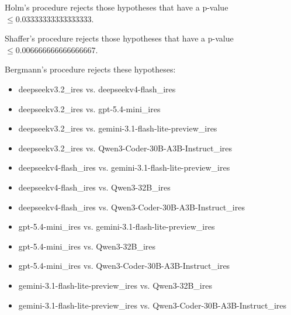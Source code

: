 \documentclass[a4paper,10pt]{article}
\begin{document}
\begin{landscape}
Holm's procedure rejects those hypotheses that have a p-value $\le0.03333333333333333$.


Shaffer's procedure rejects those hypotheses that have a p-value $\le0.006666666666666667$.


Bergmann's procedure rejects these hypotheses:


\begin{itemize}


\item deepseekv3.2_ires vs. deepseekv4-flash_ires
\item deepseekv3.2_ires vs. gpt-5.4-mini_ires
\item deepseekv3.2_ires vs. gemini-3.1-flash-lite-preview_ires
\item deepseekv3.2_ires vs. Qwen3-Coder-30B-A3B-Instruct_ires
\item deepseekv4-flash_ires vs. gemini-3.1-flash-lite-preview_ires
\item deepseekv4-flash_ires vs. Qwen3-32B_ires
\item deepseekv4-flash_ires vs. Qwen3-Coder-30B-A3B-Instruct_ires
\item gpt-5.4-mini_ires vs. gemini-3.1-flash-lite-preview_ires
\item gpt-5.4-mini_ires vs. Qwen3-32B_ires
\item gpt-5.4-mini_ires vs. Qwen3-Coder-30B-A3B-Instruct_ires
\item gemini-3.1-flash-lite-preview_ires vs. Qwen3-32B_ires
\item gemini-3.1-flash-lite-preview_ires vs. Qwen3-Coder-30B-A3B-Instruct_ires
\end{itemize}



\end{landscape}
\end{document}
